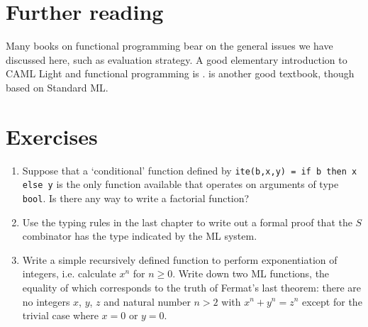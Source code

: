 \section*{Further reading}

Many books on functional programming bear on the general issues we have
discussed here, such as evaluation strategy. A good elementary introduction to
CAML Light and functional programming is .
 is another good textbook, though based on Standard ML.

\section*{Exercises}

\begin{enumerate}

\item Suppose that a `conditional' function defined by {\tt ite(b,x,y) = if b
then x else y} is the only function available that operates on arguments of
type {\tt bool}. Is there any way to write a factorial function?

\item Use the typing rules in the last chapter to write out a formal proof that
the $S$ combinator has the type indicated by the ML system.

\item Write a simple recursively defined function to perform exponentiation of
integers, i.e. calculate $x^n$ for $n \geq 0$. Write down two ML functions, the
equality of which corresponds to the truth of Fermat's last theorem: there are
no integers $x$, $y$, $z$ and natural number $n > 2$ with $x^n + y^n = z^n$
except for the trivial case where $x = 0$ or $y = 0$.

\end{enumerate}
